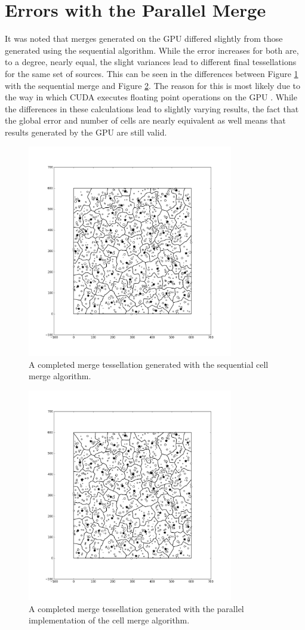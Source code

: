 \section{Errors with the Parallel Merge}
It was noted that merges generated on the GPU differed slightly from those generated using the sequential algorithm. While the error increases for both are, to a degree, nearly equal, the slight variances lead to different final tessellations for the same set of sources. This can be seen in the differences between Figure \ref{gpu:fig:seqm} with the sequential merge and Figure \ref{gpu:fig:parm}. The reason for this is most likely due to the way in which CUDA executes floating point operations on the GPU \citep{CUDA}. While the differences in these calculations lead to slightly varying results, the fact that the global error and number of cells are nearly equivalent as well means that results generated by the GPU are still valid.
\begin{figure}[H]
\centering
\includegraphics[width=0.8\textwidth]{Images/cpu_merge.png}
\caption{A completed merge tessellation generated with the sequential cell merge algorithm.}
\label{gpu:fig:seqm}
\end{figure}
\begin{figure}[H]
\centering
\includegraphics[width=0.8\textwidth]{Images/gpu_merge.png}
\caption{A completed merge tessellation generated with the parallel implementation of the cell merge algorithm.}
\label{gpu:fig:parm}
\end{figure}
